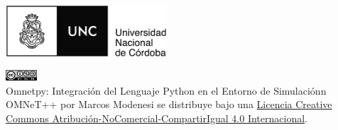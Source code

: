 \begin{titlepage}
    \begin{center}
        \large  

        \hfill

        \begingroup
            \huge
            \textbf{\textsf{ \myTitle{}}} \\ \bigskip
        \endgroup

        \myName{}

        \vfill


        \mySubtitle{} \\

        \bigskip   

        \myFaculty{} \\

        \bigskip   

        \myDirector{} \\
        \myCoDirector{} \\

        \vfill                      
        \includegraphics[width=6cm]{images/unc} \\ \medskip
        \bigskip   
        \myTime{}

        \bigskip
        \vfill
        \begingroup
            \includegraphics[width=44px]{images/licence} \\ \medskip
            \scriptsize
            Omnetpy: Integración del Lenguaje Python en el Entorno de
            Simulaciónn OMNeT++ \linebreak por Marcos Modenesi se distribuye
            bajo una \linebreak
            \href{https://creativecommons.org/licenses/by-nc-sa/4.0/}{Licencia
            Creative Commons Atribución-NoComercial-CompartirIgual 4.0
            Internacional}.\\
        \endgroup


    \end{center}  
\end{titlepage}   
